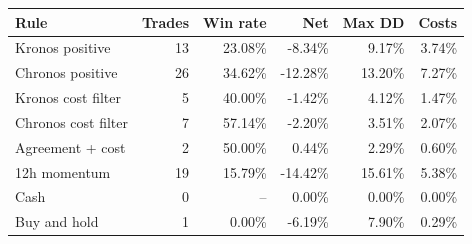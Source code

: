 \begin{tabular}{lrrrrr}
\toprule
Rule & Trades & Win rate & Net & Max DD & Costs \\
\midrule
Kronos positive & 13 & 23.08\% & -8.34\% & 9.17\% & 3.74\% \\
Chronos positive & 26 & 34.62\% & -12.28\% & 13.20\% & 7.27\% \\
Kronos cost filter & 5 & 40.00\% & -1.42\% & 4.12\% & 1.47\% \\
Chronos cost filter & 7 & 57.14\% & -2.20\% & 3.51\% & 2.07\% \\
Agreement + cost & 2 & 50.00\% & 0.44\% & 2.29\% & 0.60\% \\
12h momentum & 19 & 15.79\% & -14.42\% & 15.61\% & 5.38\% \\
Cash & 0 & -- & 0.00\% & 0.00\% & 0.00\% \\
Buy and hold & 1 & 0.00\% & -6.19\% & 7.90\% & 0.29\% \\
\bottomrule
\end{tabular}
